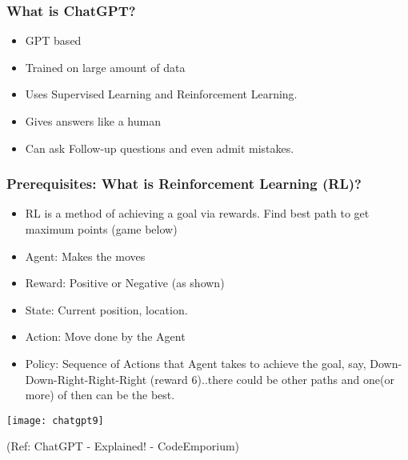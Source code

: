 \begin{frame}[fragile]\frametitle{What is ChatGPT?}


\begin{itemize}
\item GPT based
\item Trained on large amount of data
\item Uses Supervised Learning and Reinforcement Learning.
\item Gives answers like a human
\item Can ask Follow-up questions and even admit mistakes.
\end{itemize}	 

\end{frame}

\begin{frame}[fragile]\frametitle{Prerequisites: What is Reinforcement Learning (RL)?}


\begin{itemize}
\item RL is a method of achieving a goal via rewards. Find best path to get maximum points (game below)
\item Agent: Makes the moves
\item Reward: Positive or Negative (as shown)
\item State: Current position, location.
\item Action: Move done by the Agent
\item Policy: Sequence of Actions that Agent takes to achieve the goal, say, Down-Down-Right-Right-Right (reward 6)..there could be other paths and one(or more) of then can be the best.
\end{itemize}	 


			\begin{center}
			\texttt{[image: chatgpt9]}
			\end{center}		
			
			
			{\tiny (Ref: ChatGPT - Explained! - CodeEmporium)}
\end{frame}

